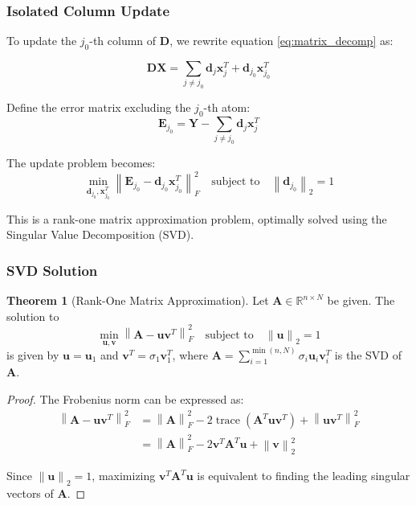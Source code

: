 \documentclass[12pt]{article}
\renewcommand{\vec}[1]{\mathbf{#1}}
\DeclareMathOperator{\trace}{trace}
\newcommand{\norm}[1]{\left\|#1\right\|}
\newcommand{\R}{\mathbb{R}}
\theoremstyle{definition}
\newtheorem{theorem}{Theorem}[section]
\begin{document}

\subsubsection{Isolated Column Update}

To update the $j_0$-th column of $\mathbf{D}$, we rewrite equation \eqref{eq:matrix_decomp} as:

\begin{equation}\label{eq:isolated_column}
    \mathbf{D}\mathbf{X} = \sum_{j \neq j_0} \vec{d}_j \vec{x}_j^T + \vec{d}_{j_0} \vec{x}_{j_0}^T
\end{equation}

Define the error matrix excluding the $j_0$-th atom:
\begin{equation}\label{eq:error_j0}
    \mathbf{E}_{j_0} = \mathbf{Y} - \sum_{j \neq j_0} \vec{d}_j \vec{x}_j^T
\end{equation}

The update problem becomes:
\begin{equation}\label{eq:rank_one_approx}
    \min_{\vec{d}_{j_0}, \vec{x}_{j_0}^T} \norm{\mathbf{E}_{j_0} - \vec{d}_{j_0} \vec{x}_{j_0}^T}_F^2 \quad \text{subject to} \quad \norm{\vec{d}_{j_0}}_2 = 1
\end{equation}

This is a rank-one matrix approximation problem, optimally solved using the Singular Value Decomposition (SVD).

\subsubsection{SVD Solution}

\begin{theorem}[Rank-One Matrix Approximation]\label{thm:rank_one}
    Let $\mathbf{A} \in \R^{n \times N}$ be given. The solution to
    \begin{equation}
        \min_{\vec{u}, \vec{v}} \norm{\mathbf{A} - \vec{u}\vec{v}^T}_F^2 \quad \text{subject to} \quad \norm{\vec{u}}_2 = 1
    \end{equation}
    is given by $\vec{u} = \vec{u}_1$ and $\vec{v}^T = \sigma_1 \vec{v}_1^T$, where $\mathbf{A} = \sum_{i=1}^{\min(n,N)} \sigma_i \vec{u}_i \vec{v}_i^T$ is the SVD of $\mathbf{A}$.
\end{theorem}

\begin{proof}
    The Frobenius norm can be expressed as:
    \begin{align}
        \norm{\mathbf{A} - \vec{u}\vec{v}^T}_F^2 & = \norm{\mathbf{A}}_F^2 - 2\trace(\mathbf{A}^T\vec{u}\vec{v}^T) + \norm{\vec{u}\vec{v}^T}_F^2 \\
                                                 & = \norm{\mathbf{A}}_F^2 - 2\vec{v}^T\mathbf{A}^T\vec{u} + \norm{\vec{v}}_2^2
    \end{align}

    Since $\norm{\vec{u}}_2 = 1$, maximizing $\vec{v}^T\mathbf{A}^T\vec{u}$ is equivalent to finding the leading singular vectors of $\mathbf{A}$.
\end{proof}
\end{document}
